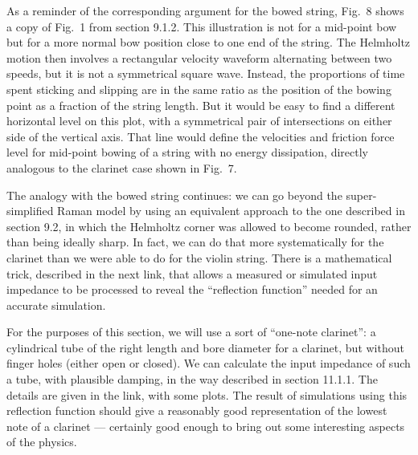 
  As a reminder of the corresponding argument for the bowed string, Fig.\ 8 
  shows a copy of Fig.\ 1 from section 9.1.2. This illustration is not for a 
  mid-point bow but for a more normal bow position close to one end of the 
  string. The Helmholtz motion then involves a rectangular velocity waveform 
  alternating between two speeds, but it is not a symmetrical square wave. 
  Instead, the proportions of time spent sticking and slipping are in the same 
  ratio as the position of the bowing point as a fraction of the string length. 
  But it would be easy to find a different horizontal level on this plot, with 
  a symmetrical pair of intersections on either side of the vertical axis. That 
  line would define the velocities and friction force level for mid-point 
  bowing of a string with no energy dissipation, directly analogous to the 
  clarinet case shown in Fig.\ 7. 


  The analogy with the bowed string continues: we can go beyond the 
  super-simplified Raman model by using an equivalent approach to the one 
  described in section 9.2, in which the Helmholtz corner was allowed to become 
  rounded, rather than being ideally sharp. In fact, we can do that more 
  systematically for the clarinet than we were able to do for the violin 
  string. There is a mathematical trick, described in the next link, that 
  allows a measured or simulated input impedance to be processed to reveal the 
  “reflection function” needed for an accurate simulation. 

  For the purposes of this section, we will use a sort of “one-note clarinet”: 
  a cylindrical tube of the right length and bore diameter for a clarinet, but 
  without finger holes (either open or closed). We can calculate the input 
  impedance of such a tube, with plausible damping, in the way described in 
  section 11.1.1. The details are given in the link, with some plots. The 
  result of simulations using this reflection function should give a reasonably 
  good representation of the lowest note of a clarinet --- certainly good 
  enough to bring out some interesting aspects of the physics. 

